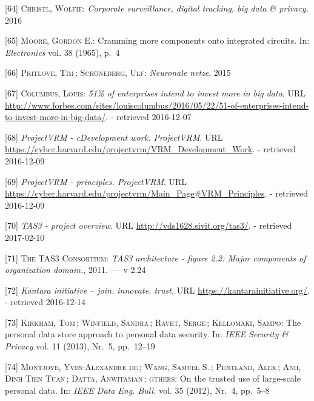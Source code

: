 \documentclass[12pt,english,a4paper,titlepage,cleardoublepage=empty,dottedtoc]{report}
\begin{document}
\hypertarget{ref-video_2016_corporate-surveillance-digital-tracking-big-data-privacy}{}
{[}64{]} \textsc{Christl, Wolfie}: \emph{Corporate surveillance, digital
tracking, big data \& privacy}, 2016

\hypertarget{ref-paper_1965_moors-law}{}
{[}65{]} \textsc{Moore, Gordon E.}: Cramming more components onto
integrated circuits. In: \emph{Electronics} vol. 38 (1965), p.~4

\hypertarget{ref-podcast_2015_cre-neuronale-netze}{}
{[}66{]} \textsc{Pritlove, Tim}\,; \textsc{Schöneberg, Ulf}:
\emph{Neuronale netze}, 2015

\hypertarget{ref-web_2016_industries-intention-to-invest-in-big-data}{}
{[}67{]} \textsc{Columbus, Louis}: \emph{51\% of enterprises intend to
invest more in big data}. URL
\url{http://www.forbes.com/sites/louiscolumbus/2016/05/22/51-of-enterprises-intend-to-invest-more-in-big-data/}.
- retrieved 2016-12-07

\hypertarget{ref-web_2016_projectvrm_development-work}{}
{[}68{]} \emph{ProjectVRM - cDevelopment work. ProjectVRM}. URL
\url{https://cyber.harvard.edu/projectvrm/VRM_Development_Work}. -
retrieved 2016-12-09

\hypertarget{ref-web_2016_projectvrm_principles}{}
{[}69{]} \emph{ProjectVRM - principles. ProjectVRM}. URL
\url{https://cyber.harvard.edu/projectvrm/Main_Page\#VRM_Principles}. -
retrieved 2016-12-09

\hypertarget{ref-web_2011_tas3-project}{}
{[}70{]} \emph{TAS3 - project overview}. URL
\url{http://vds1628.sivit.org/tas3/}. - retrieved 2017-02-10

\hypertarget{ref-graphic_2011_architecture_components-of-organization-domain}{}
{[}71{]} \textsc{The TAS3 Consortium}: \emph{TAS3 architecture - figure
2.2: Major components of organization domain.}, 2011. ---~v 2.24

\hypertarget{ref-web_kantara-initiative}{}
{[}72{]} \emph{Kantara initiative -- join. innovate. trust.} URL
\url{https://kantarainitiative.org/}. - retrieved 2016-12-14

\hypertarget{ref-paper_2014_personal-data-store-approach}{}
{[}73{]} \textsc{Kirkham, Tom}\,; \textsc{Winfield, Sandra}\,;
\textsc{Ravet, Serge}\,; \textsc{Kellomaki, Sampo}: The personal data
store approach to personal data security. In: \emph{IEEE Security \&
Privacy} vol. 11 (2013), Nr.~5, pp.~12--19

\hypertarget{ref-paper_2012_openpds_on-trusted-use-of-large-scale-personal-data}{}
{[}74{]} \textsc{Montjoye, Yves-Alexandre de}\,; \textsc{Wang, Samuel
S.}\,; \textsc{Pentland, Alex}\,; \textsc{Anh, Dinh Tien Tuan}\,;
\textsc{Datta, Anwitaman}\,; \textsc{others}: On the trusted use of
large-scale personal data. In: \emph{IEEE Data Eng. Bull.} vol. 35
(2012), Nr.~4, pp.~5--8
\end{document}
